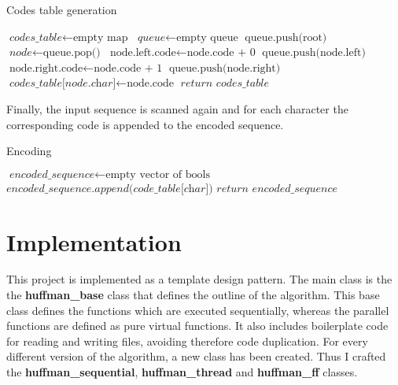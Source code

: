\documentclass{report}
\begin{document}
\begin{algorithm}
    \caption{Codes table generation}
    \begin{algorithmic}[1]
        \State $\textit{codes\_table} \gets \text{empty map}$
        \State $\textit{queue} \gets \text{empty queue}$
        \State $\text{queue.push(root)}$
        \State $\textit{node} \gets \text{queue.pop()}$
        \State $\text{node.left.code} \gets \text{node.code + 0}$
        \State $\text{queue.push(node.left)}$
        \EndIf
        \State $\text{node.right.code} \gets \text{node.code + 1}$
        \State $\text{queue.push(node.right)}$
        \EndIf
        \State $\textit{codes\_table[node.char]} \gets \text{node.code}$
        \EndIf
        \EndWhile
        \State $ \textit{return codes\_table}$
        \EndProcedure
    \end{algorithmic}
\end{algorithm}

Finally, the input sequence is scanned again and for each character the corresponding
code is appended to the encoded sequence.

\begin{algorithm}
    \caption{Encoding}
    \begin{algorithmic}[1]

        \State $\textit{encoded\_sequence} \gets \text{empty vector of bools}$
        \State $\textit{encoded\_sequence.append(code\_table[char])}$
        \EndFor
        \State $ \textit{return encoded\_sequence}$
        \EndProcedure
    \end{algorithmic}
\end{algorithm}

\chapter{Implementation}
This project is implemented as a template design pattern. The main class is the
the \textbf{huffman\_base} class that defines the outline of the algorithm.
This base class defines the functions which are executed sequentially, whereas
the parallel functions are defined as pure virtual functions.
It also includes boilerplate code for reading and writing files,
avoiding therefore code duplication.
For every different version of the algorithm, a new class has been created.
Thus I crafted the \textbf{huffman\_sequential}, \textbf{huffman\_thread} and
\textbf{huffman\_ff} classes.
\end{document}
